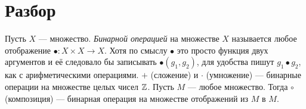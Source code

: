 \documentclass[a4paper,12pt]{article}
\begin{document}
    
    \section{Разбор}
    
     Пусть $X$ --- множество. \emph{Бинарной операцией} на множестве $X$ называется любое отображение $\bullet \colon X \times X \to X$. Хотя по смыслу $\bullet$ это просто функция двух аргументов и её следовало бы записывать $\bullet(g_1, g_2)$, для удобства пишут $g_1 \bullet g_2$, как с арифметическими операциями.
    \example $+$ (сложение) и $\cdot$ (умножение) --- бинарные операции на множестве целых чисел $\mathbb{Z}$.
    \example Пусть $M$ --- любое множество. Тогда $\circ$ (композиция) --- бинарная операция на множестве отображений из $M$ в $M$.
\end{document}
